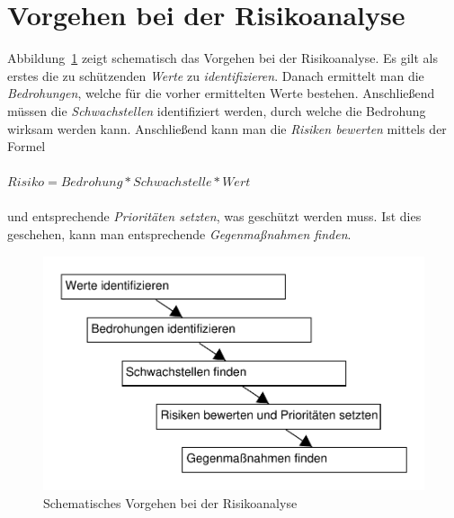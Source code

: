 \section{Vorgehen bei der Risikoanalyse}

Abbildung~\ref{5analysestufen} zeigt schematisch das Vorgehen bei der Risikoanalyse. Es gilt als erstes die zu schützenden \textit{Werte} zu \textit{identifizieren}. Danach ermittelt man die \textit{Bedrohungen}, welche für die vorher ermittelten Werte bestehen. Anschließend müssen die \textit{Schwachstellen} identifiziert werden, durch welche die Bedrohung wirksam werden kann. Anschließend kann man die \textit{Risiken bewerten} mittels der Formel
\\\\
$ Risiko = Bedrohung * Schwachstelle * Wert $
\\\\
und entsprechende \textit{Prioritäten setzten}, was geschützt werden muss. Ist dies geschehen, kann man entsprechende \textit{Gegenmaßnahmen finden}.

\begin{figure}[h]
\includegraphics[scale=0.8]{images/5analysestufen.pdf}
\caption{Schematisches Vorgehen bei der Risikoanalyse}
\label{5analysestufen}
\end{figure}



